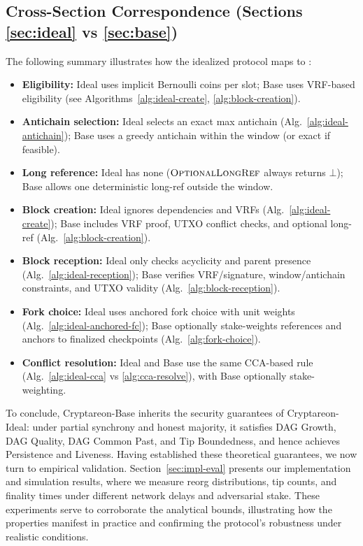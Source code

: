 \subsection{Cross-Section Correspondence (Sections \ref{sec:ideal} vs \ref{sec:base})}
The following summary illustrates how the idealized protocol maps to \ProjBase:
\begin{itemize}
  \item \textbf{Eligibility:} Ideal uses implicit Bernoulli coins per slot; Base uses VRF-based eligibility (see Algorithms~\ref{alg:ideal-create}, \ref{alg:block-creation}).
  \item \textbf{Antichain selection:} Ideal selects an exact max antichain (Alg.~\ref{alg:ideal-antichain}); Base uses a greedy antichain within the window (or exact if feasible).
  \item \textbf{Long reference:} Ideal has none ($\textsc{OptionalLongRef}$ always returns $\bot$); Base allows one deterministic long-ref outside the window.
  \item \textbf{Block creation:} Ideal ignores dependencies and VRFs (Alg.~\ref{alg:ideal-create}); Base includes VRF proof, UTXO conflict checks, and optional long-ref (Alg.~\ref{alg:block-creation}).
  \item \textbf{Block reception:} Ideal only checks acyclicity and parent presence (Alg.~\ref{alg:ideal-reception}); Base verifies VRF/signature, window/antichain constraints, and UTXO validity (Alg.~\ref{alg:block-reception}).
  \item \textbf{Fork choice:} Ideal uses anchored fork choice with unit weights (Alg.~\ref{alg:ideal-anchored-fc}); Base optionally stake-weights references and anchors to finalized checkpoints (Alg.~\ref{alg:fork-choice}).
  \item \textbf{Conflict resolution:} Ideal and Base use the same CCA-based rule (Alg.~\ref{alg:ideal-cca} vs \ref{alg:cca-resolve}), with Base optionally stake-weighting.
\end{itemize}

To conclude, Cryptareon-Base inherits the security guarantees of Cryptareon-Ideal: under partial synchrony and honest majority, it satisfies DAG Growth, DAG Quality, DAG Common Past, and Tip Boundedness, and hence achieves Persistence and Liveness. Having established these theoretical guarantees, we now turn to empirical validation. Section~\ref{sec:impl-eval} presents our implementation and simulation results, where we measure reorg distributions, tip counts, and finality times under different network delays and adversarial stake. These experiments serve to corroborate the analytical bounds, illustrating how the properties manifest in practice and confirming the protocol’s robustness under realistic conditions.
